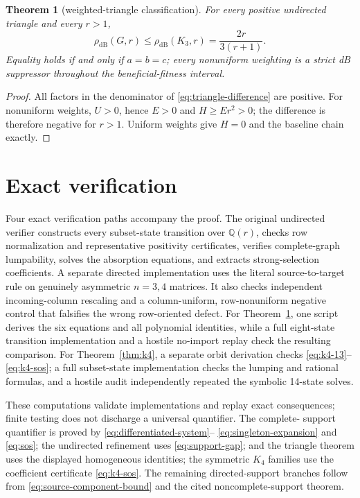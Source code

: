 \documentclass[11pt]{article}
\newtheorem{theorem}{Theorem}
\newcommand{\dB}{\mathrm{dB}}
\begin{document}
\begin{theorem}[weighted-triangle classification]\label{thm:triangle}
For every positive undirected triangle and every $r>1$,
\[
 \rho_{\dB}(G,r)\le\rho_{\dB}(K_3,r)=\frac{2r}{3(r+1)}.
\]
Equality holds if and only if $a=b=c$; every nonuniform weighting is a strict
dB suppressor throughout the beneficial-fitness interval.
\end{theorem}

\begin{proof}
All factors in the denominator of \eqref{eq:triangle-difference} are positive.
For nonuniform weights, $U>0$, hence $E>0$ and $H\ge Er^2>0$; the difference
is therefore negative for $r>1$.  Uniform weights give $H=0$ and the baseline
chain exactly.
\end{proof}



\section{Exact verification}

Four exact verification paths accompany the proof.  The original undirected
verifier constructs every subset-state transition over $\mathbb Q(r)$, checks
row normalization and representative positivity certificates, verifies
complete-graph lumpability, solves the absorption equations, and extracts
strong-selection coefficients.  A separate directed implementation uses the
literal source-to-target rule on genuinely asymmetric $n=3,4$ matrices.  It
also checks independent incoming-column rescaling and a column-uniform,
row-nonuniform negative control that falsifies the wrong row-oriented defect.
For Theorem~\ref{thm:triangle}, one script derives the six equations and all
polynomial identities, while a full eight-state transition implementation and
a hostile no-import replay check the resulting comparison.  For
Theorem~\ref{thm:k4}, a separate orbit derivation checks
\eqref{eq:k4-13}--\eqref{eq:k4-sos}; a full subset-state implementation checks
the lumping and rational formulas, and a hostile audit independently repeated
the symbolic 14-state solves.

These computations validate implementations and replay exact consequences;
finite testing does not discharge a universal quantifier.  The complete-
support quantifier is proved by \eqref{eq:differentiated-system}--
\eqref{eq:singleton-expansion} and \eqref{eq:sos}; the undirected refinement
uses \eqref{eq:support-gap}; and the triangle theorem uses the displayed
homogeneous identities; the symmetric $K_4$ families use the coefficient
certificate \eqref{eq:k4-sos}.  The remaining directed-support branches follow from
\eqref{eq:source-component-bound} and the cited noncomplete-support theorem.
\end{document}
